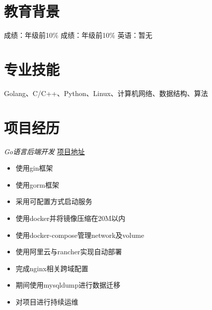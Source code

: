 \documentclass{uniquecv}
\begin{document}
\medskip



\section{教育背景}
成绩：年级前10\%
成绩：年级前10\% \quad 英语：暂无



\section{专业技能}
\smallskip
Golang、C/C++、Python、Linux、计算机网络、数据结构、算法




\section{项目经历}

\textit{Go语言后端开发}
\href{https://github.com/colinaaa/UniqueHackDayDashboard-backend}{项目地址}
\vspace{0.4ex}

\begin{itemize}
  \item 使用gin框架
  \item 使用gorm框架
  \item 采用可配置方式启动服务
  \item 使用docker并将镜像压缩在20M以内
  \item 使用docker-compose管理network及volume
  \item 使用阿里云与rancher实现自动部署
  \item 完成nginx相关跨域配置
  \item 期间使用mysqldump进行数据迁移
  \item 对项目进行持续运维
\end{itemize}
\end{document}
